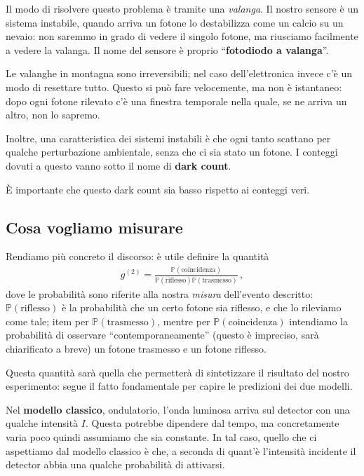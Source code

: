 \documentclass[a4paper,12pt]{article}
\begin{document}
Il modo di risolvere questo problema è tramite una \emph{valanga}.
Il nostro sensore è un sistema instabile, quando arriva un fotone lo destabilizza come un calcio su un nevaio: non saremmo in grado di vedere il singolo fotone, ma riusciamo facilmente a vedere la valanga.
Il nome del sensore è proprio ``\textbf{fotodiodo a valanga}''.

Le valanghe in montagna sono irreversibili; nel caso dell'elettronica invece c'è un modo di resettare tutto.
Questo si può fare velocemente, ma non è istantaneo: dopo ogni fotone rilevato c'è una finestra temporale nella quale, se ne arriva un altro, non lo sapremo. 

Inoltre, una caratteristica dei sistemi instabili è che ogni tanto scattano per qualche perturbazione ambientale, senza che ci sia stato un fotone. 
I conteggi dovuti a questo vanno sotto il nome di \textbf{dark count}.

È importante che questo dark count sia basso rispetto ai conteggi veri.

\subsection{Cosa vogliamo misurare}

Rendiamo più concreto il discorso: è utile definire la quantità 
%
\begin{align}
g^{(2)} = \frac{\mathbb{P}(\text{coincidenza})}{\mathbb{P}(\text{riflesso})\mathbb{P}(\text{trasmesso})}
\,,
\end{align}
%
dove le probabilità sono riferite alla nostra \emph{misura} dell'evento descritto: \(\mathbb{P} (\text{riflesso})\) è la probabilità che un certo fotone sia riflesso, e che lo rileviamo come tale; item per \(\mathbb{P}(\text{trasmesso})\), mentre per \(\mathbb{P}(\text{coincidenza})\) intendiamo la probabilità di osservare ``contemporaneamente'' (questo è impreciso, sarà chiarificato a breve) un fotone trasmesso e un fotone riflesso.


Questa quantità sarà quella che permetterà di sintetizzare il risultato del nostro esperimento: segue il fatto fondamentale per capire le predizioni dei due modelli. 

Nel \textbf{modello classico}, ondulatorio, l'onda luminosa arriva sul detector con una qualche intensità \(I\). Questa potrebbe dipendere dal tempo, ma concretamente varia poco quindi assumiamo che sia constante.
In tal caso, quello che ci aspettiamo dal modello classico è che, a seconda di quant'è l'intensità incidente il detector abbia una qualche probabilità di attivarsi. 
\end{document}
